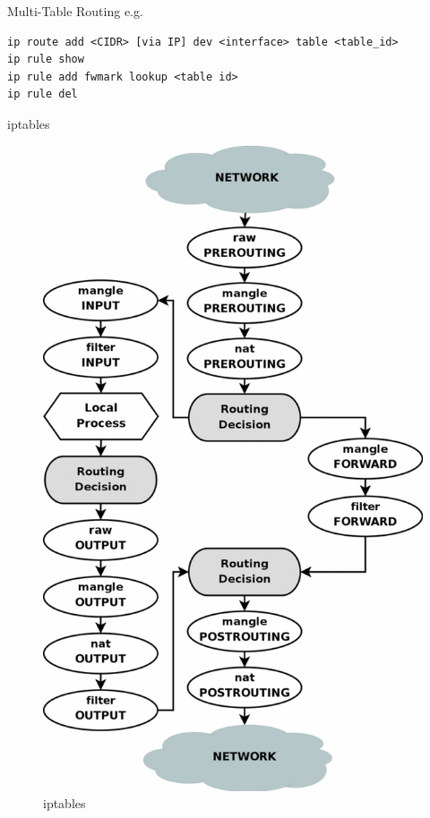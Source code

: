 \documentclass[UTF8]{ctexbeamer}
\begin{document}
\begin{frame}[fragile]{Multi-Table Routing}
e.g.
\begin{verbatim}
ip route add <CIDR> [via IP] dev <interface> table <table_id>
ip rule show
ip rule add fwmark lookup <table id>
ip rule del 
\end{verbatim}
  
    
\end{frame}
\begin{frame}{iptables}
    \begin{figure}
        \centering
        \includegraphics[height=0.5\textwidth]{tables_traverse.jpg}
        \caption{iptables}
    \end{figure}
\end{frame}
\end{document}
